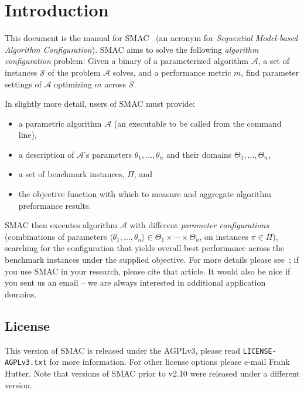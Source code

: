 \documentclass[manual.tex]{subfiles}
\begin{document}
\section{Introduction}\label{sec:intro}

This document is the manual for SMAC~\cite{HutHooLey11-SMAC} (an acronym for \emph{Sequential Model-based Algorithm Configuration}). SMAC aims to solve the following \emph{algorithm configuration} problem: Given a binary of a parameterized algorithm $\mathcal{A}$, a set of instances $\mathcal{S}$ of the problem $\mathcal{A}$ solves, and a performance metric $m$, find parameter settings of $\mathcal{A}$ optimizing $m$ across $\mathcal{S}$.

In slightly more detail, users of SMAC must provide:
\begin{itemize}
\item a parametric algorithm $\mathcal{A}$ (an executable to be called from
the command line), 
\item a description of $\mathcal{A}$'s parameters $\theta_1,\dots,\theta_n$ and their domains $\Theta_1, \dots, \Theta_n$, 
\item a set of benchmark instances, $\Pi$, and
\item the objective function with which to measure and aggregate algorithm preformance results.
\end{itemize}

SMAC then executes algorithm $\mathcal{A}$ with different \emph{parameter configurations} (combinations of parameters 
$\langle{}\theta_1,\dots,\theta_n\rangle{} \in \Theta_1 \times \cdots \times \Theta_n$, on instances $\pi \in \Pi$),
searching for the configuration that yields overall best performance across the benchmark instances under the supplied objective. For more details please see~\cite{HutHooLey11-SMAC}; if you use SMAC in your research, please cite that article. It would also be nice if you sent us an email -- we are always interested in additional application domains.

\subsection{License}

This version of SMAC is released under the AGPLv3, please read \texttt{LICENSE-AGPLv3.txt} for more information. For other license options please e-mail Frank Hutter. Note that versions of SMAC prior to v2.10 were released under a different version.
\end{document}
